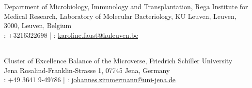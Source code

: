 
        {Department of Microbiology, Immunology and Transplantation, Rega Institute for Medical Research, Laboratory of Molecular Bacteriology, KU Leuven,
        Leuven, 3000, Leuven, Belgium
        \\ 
        \faPhone: +3216322698 | 
        \faAt: \href{mailto:karoline.faust@kuleuven.be}{karoline.faust@kuleuven.be}}
      
    \\ 


        


        {Cluster of Excellence Balance of the Microverse,
        Friedrich Schiller University Jena 
        Rosalind-Franklin-Strasse 1, 07745 Jena, Germany \\ \faPhone: +49 3641 9-49786  | 
        \faAt: \href{mailto:johannes.zimmermann@uni-jena.de }{johannes.zimmermann@uni-jena.de}}
        
    \\










